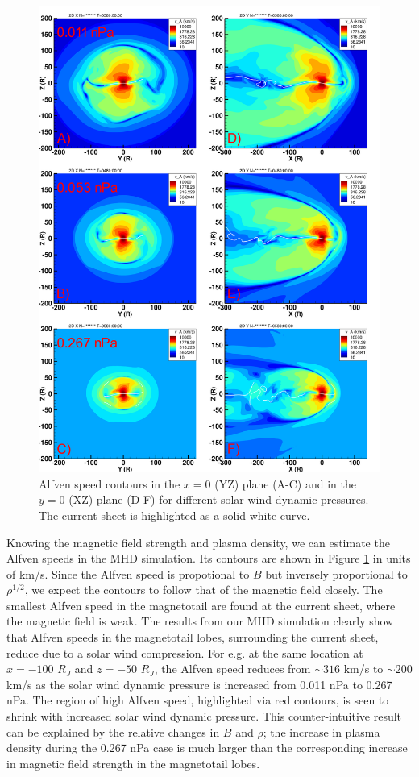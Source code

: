 \begin{figure}
    \centering
    \includegraphics[height=0.9\textheight]{images6/compare_runs_currentsheet_AlfvenSpeed.png}
    \caption{Alfven speed contours in the $x=0$ (YZ) plane (A-C) and in the $y=0$ (XZ) plane (D-F) for different solar wind dynamic pressures. The current sheet is highlighted as a solid white curve.}
    \label{fig:chp6-comparison-slices-alfven}
\end{figure}

Knowing the magnetic field strength and plasma density, we can estimate the Alfven speeds in the MHD simulation. Its contours are shown in Figure \ref{fig:chp6-comparison-slices-alfven} in units of km/s. Since the Alfven speed is propotional to $B$ but inversely proportional to $\rho^{1/2}$, we expect the contours to follow that of the magnetic field closely. The smallest Alfven speed in the magnetotail are found at the current sheet, where the magnetic field is weak. The results from our MHD simulation clearly show that Alfven speeds in the magnetotail lobes, surrounding the current sheet, reduce due to a solar wind compression. For e.g. at the same location at $x=-100$ $R_J$ and $z=-50$ $R_J$, the Alfven speed reduces from $\sim316$ km/s to $\sim200$ km/s as the solar wind dynamic pressure is increased from 0.011 nPa to 0.267 nPa. The region of high Alfven speed, highlighted via red contours, is seen to shrink with increased solar wind dynamic pressure. This counter-intuitive result can be explained by the relative changes in $B$ and $\rho$; the increase in plasma density during the 0.267 nPa case is much larger than the corresponding increase in magnetic field strength in the magnetotail lobes. 

